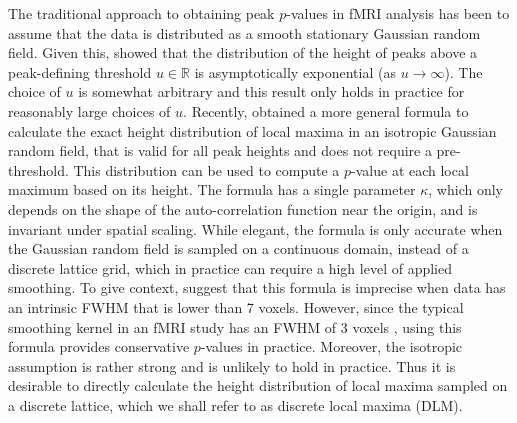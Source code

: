 \documentclass{article}
\newcommand{\nt}[1]{\textit{\color{red} #1}}
\begin{document}
The traditional approach to obtaining peak $p$-values in fMRI analysis has been to assume that the data is distributed as a smooth stationary Gaussian random field. Given this, \cite{nosko1969local, adler1981geometry, cheng2015distribution} showed that the distribution of the height of peaks above a peak-defining threshold $u \in \mathbb{R}$ is asymptotically exponential (as $u \rightarrow \infty$). The choice of $u$ is somewhat arbitrary and this result only holds in practice for reasonably large choices of $u$. Recently, \cite{cheng2015distribution} obtained a more general formula to calculate the exact height distribution of local maxima in an isotropic Gaussian random field, that is valid for all peak heights and does not require a pre-threshold. This distribution can be used to compute a $p$-value at each local maximum based on its height. The formula has a single parameter $\kappa$, which only depends on the shape of the auto-correlation function near the origin, and is invariant under spatial scaling. While elegant, the formula is only accurate when the Gaussian random field is sampled on a continuous domain, instead of a discrete lattice grid, which in practice can require a high level of applied smoothing. To give context, \cite{schwartzman2019peak} suggest that this formula is imprecise when data has an intrinsic FWHM that is lower than 7 voxels. However, since the typical smoothing kernel in an fMRI study has an FWHM of 3 voxels \nt{\citep{eklund2016cluster}}, using this formula provides conservative $p$-values in practice. Moreover, the isotropic assumption is rather strong and is unlikely to hold in practice. Thus it is desirable to directly calculate the height distribution of local maxima sampled on a discrete lattice, which we shall refer to as discrete local maxima (DLM).

\end{document}
